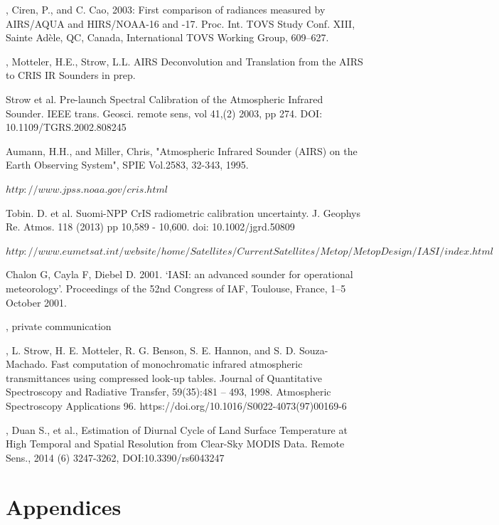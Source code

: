 \documentclass[11pt]{article}
\begin{document}
\begin{thebibliography}{9}
  \emph{},
  Ciren, P., and C. Cao, 2003: First comparison of radiances measured by AIRS/AQUA and HIRS/NOAA-16 and -17. 
  Proc. Int. TOVS Study Conf. XIII, Sainte Adèle, QC, Canada, International TOVS Working Group, 609–627.

  \emph{},
  Motteler, H.E., Strow, L.L.
  AIRS Deconvolution and Translation from the AIRS to CRIS IR Sounders
  in prep.

  Strow et al. 
  Pre-launch Spectral Calibration of the Atmospheric Infrared Sounder.
  IEEE trans. Geosci. remote sens,
  vol 41,(2) 2003, pp 274.
  DOI: 10.1109/TGRS.2002.808245

  Aumann, H.H., and Miller, Chris, 
  "Atmospheric Infrared Sounder (AIRS) on the Earth Observing System", 
  SPIE Vol.2583, 32-343, 1995.

 $ http://www.jpss.noaa.gov/cris.html $

  Tobin. D. et al.
  Suomi-NPP CrIS radiometric calibration uncertainty.
  J. Geophys Re. Atmos. 118 (2013) pp 10,589 - 10,600.
  doi: 10.1002/jgrd.50809

  $ http://www.eumetsat.int/website/home/Satellites/CurrentSatellites/Metop/MetopDesign/IASI/index.html $

  Chalon G, Cayla F, Diebel D. 2001. 
  ‘IASI: an advanced sounder for operational meteorology’. 
  Proceedings of the 52nd Congress of IAF, Toulouse, France, 1–5 October 2001.

  \emph{},
  private communication

  \emph{},
  L. Strow, H. E. Motteler, R. G. Benson, S. E. Hannon, and S. D. Souza-Machado. 
  Fast computation of monochromatic infrared atmospheric transmittances using compressed look-up tables. 
  Journal of Quantitative Spectroscopy and Radiative Transfer, 59(35):481 – 493, 1998. 
  Atmospheric Spectroscopy Applications 96.
  https://doi.org/10.1016/S0022-4073(97)00169-6

  \emph{},
  Duan S., et al.,
  Estimation of Diurnal Cycle of Land Surface Temperature at High Temporal and Spatial Resolution from Clear-Sky MODIS Data.
  Remote Sens., 2014 (6) 3247-3262,
  DOI:10.3390/rs6043247
  
\end{thebibliography}


\section{Appendices}
\label{sec:orgheadline18}
\end{document}
